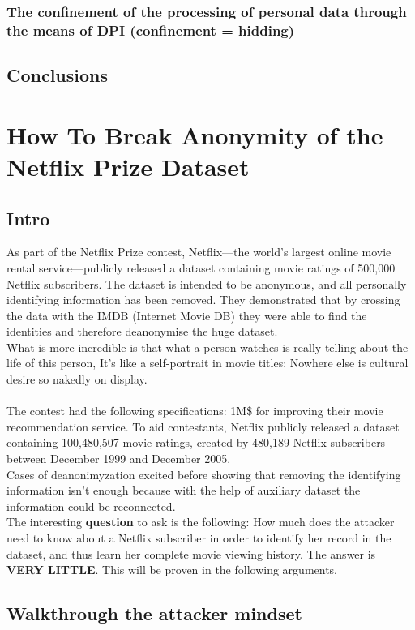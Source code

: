 \documentclass[10pt,a4paper]{report}
\begin{document}
\subsection{The confinement of the processing of personal data through the means of DPI (confinement = hidding)}
\section{Conclusions}
\chapter{How To Break Anonymity of the Netflix Prize Dataset}
\section{Intro}
As part of the Netflix Prize contest, Netflix—the world’s largest online movie rental service—publicly released a dataset containing movie ratings of 500,000 Netflix subscribers. The dataset is intended to be anonymous, and all personally identifying information has been removed. They demonstrated that by crossing the data with the IMDB (Internet Movie DB) they were able to find the identities and therefore deanonymise the huge dataset.\\
What is more incredible is that what a person watches is really telling about the life of this person,  It’s like a self-portrait in movie titles: Nowhere else is cultural desire so nakedly on display.\\\\
The contest had the following specifications: 1M\$ for improving their movie recommendation service. To aid contestants, Netflix publicly released a dataset containing 100,480,507 movie ratings, created by 480,189 Netflix subscribers between December 1999 and December 2005.\\
Cases of deanonimyzation excited before showing that removing the identifying information isn't enough because with the help of auxiliary dataset the information could be reconnected.\\
The interesting \textbf{question} to ask is the following: How  much  does  the  attacker  need  to  know about a Netflix subscriber in order to identify her record in the dataset, and thus learn her complete movie viewing history. The answer is \textbf{VERY LITTLE}. This will be proven in the following arguments.
\section{Walkthrough the attacker mindset}
\end{document}

